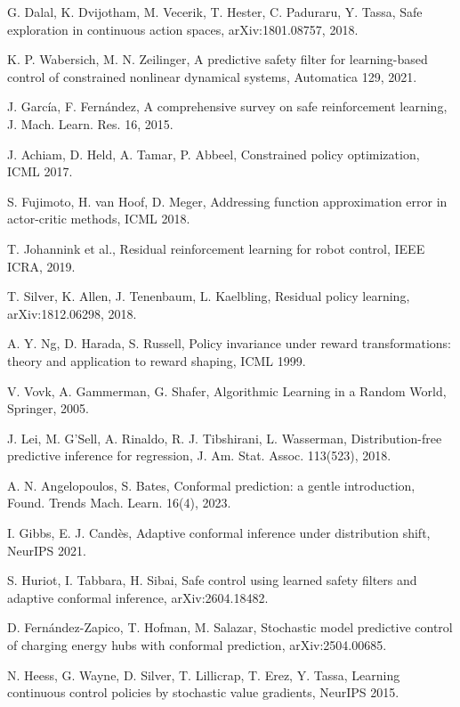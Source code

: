 \documentclass[11pt]{article}
\begin{document}
\begin{list}{}{\setlength{\leftmargin}{2.4em}\setlength{\labelwidth}{2.4em}\setlength{\itemsep}{2pt}\setlength{\parsep}{0pt}}
\item[\rrow{dalal}] G. Dalal, K. Dvijotham, M. Vecerik, T. Hester, C. Paduraru, Y. Tassa, Safe exploration in continuous action spaces, arXiv:1801.08757, 2018.
\item[\rrow{wabersich}] K. P. Wabersich, M. N. Zeilinger, A predictive safety filter for learning-based control of constrained nonlinear dynamical systems, Automatica 129, 2021.
\item[\rrow{garcia}] J. Garc\'ia, F. Fern\'andez, A comprehensive survey on safe reinforcement learning, J. Mach. Learn. Res. 16, 2015.
\item[\rrow{achiam}] J. Achiam, D. Held, A. Tamar, P. Abbeel, Constrained policy optimization, ICML 2017.
\item[\rrow{td3}] S. Fujimoto, H. van Hoof, D. Meger, Addressing function approximation error in actor-critic methods, ICML 2018.
\item[\rrow{johannink}] T. Johannink et al., Residual reinforcement learning for robot control, IEEE ICRA, 2019.
\item[\rrow{silverres}] T. Silver, K. Allen, J. Tenenbaum, L. Kaelbling, Residual policy learning, arXiv:1812.06298, 2018.
\item[\rrow{ng}] A. Y. Ng, D. Harada, S. Russell, Policy invariance under reward transformations: theory and application to reward shaping, ICML 1999.
\item[\rrow{vovk}] V. Vovk, A. Gammerman, G. Shafer, Algorithmic Learning in a Random World, Springer, 2005.
\item[\rrow{lei}] J. Lei, M. G'Sell, A. Rinaldo, R. J. Tibshirani, L. Wasserman, Distribution-free predictive inference for regression, J. Am. Stat. Assoc. 113(523), 2018.
\item[\rrow{angelopoulos}] A. N. Angelopoulos, S. Bates, Conformal prediction: a gentle introduction, Found. Trends Mach. Learn. 16(4), 2023.
\item[\rrow{aci}] I. Gibbs, E. J. Cand\`es, Adaptive conformal inference under distribution shift, NeurIPS 2021.
\item[\rrow{acofi}] S. Huriot, I. Tabbara, H. Sibai, Safe control using learned safety filters and adaptive conformal inference, arXiv:2604.18482.
\item[\rrow{zapico}] D. Fern\'andez-Zapico, T. Hofman, M. Salazar, Stochastic model predictive control of charging energy hubs with conformal prediction, arXiv:2504.00685.
\item[\rrow{heess}] N. Heess, G. Wayne, D. Silver, T. Lillicrap, T. Erez, Y. Tassa, Learning continuous control policies by stochastic value gradients, NeurIPS 2015.

\end{list}
\end{document}

